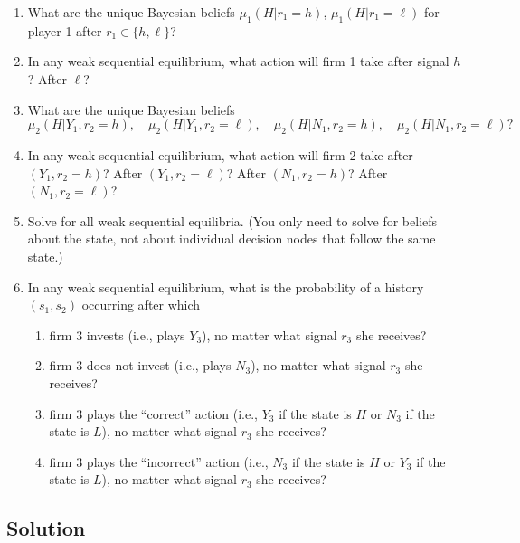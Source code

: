 \documentclass[10pt, a4paper]{article}
\begin{document}
      \begin{enumerate}
          \item What are the unique Bayesian beliefs $\mu_1(H|r_1 = h)$, $\mu_1(H|r_1 = \ell)$ for player 1 after $r_1 \in \{h, \ell\}$?
          \item In any weak sequential equilibrium, what action will firm 1 take after signal $h$? After $\ell$?
          \item What are the unique Bayesian beliefs
          \[
          \mu_2(H|Y_1, r_2 = h), \quad \mu_2(H|Y_1, r_2 = \ell), \quad \mu_2(H|N_1, r_2 = h), \quad \mu_2(H|N_1, r_2 = \ell)?
          \]
          \item In any weak sequential equilibrium, what action will firm 2 take after $(Y_1, r_2 = h)$? After $(Y_1, r_2 = \ell)$? After $(N_1, r_2 = h)$? After $(N_1, r_2 = \ell)$?
          \item Solve for all weak sequential equilibria. (You only need to solve for beliefs about the state, not about individual decision nodes that follow the same state.)
          \item In any weak sequential equilibrium, what is the probability of a history $(s_1, s_2)$ occurring after which
          \begin{enumerate}
              \item firm 3 invests (i.e., plays $Y_3$), no matter what signal $r_3$ she receives?
              \item firm 3 does not invest (i.e., plays $N_3$), no matter what signal $r_3$ she receives?
              \item firm 3 plays the “correct” action (i.e., $Y_3$ if the state is $H$ or $N_3$ if the state is $L$), no matter what signal $r_3$ she receives?
              \item firm 3 plays the “incorrect” action (i.e., $N_3$ if the state is $H$ or $Y_3$ if the state is $L$), no matter what signal $r_3$ she receives?
          \end{enumerate}
      \end{enumerate}
    \subsection*{Solution}
\end{document}
